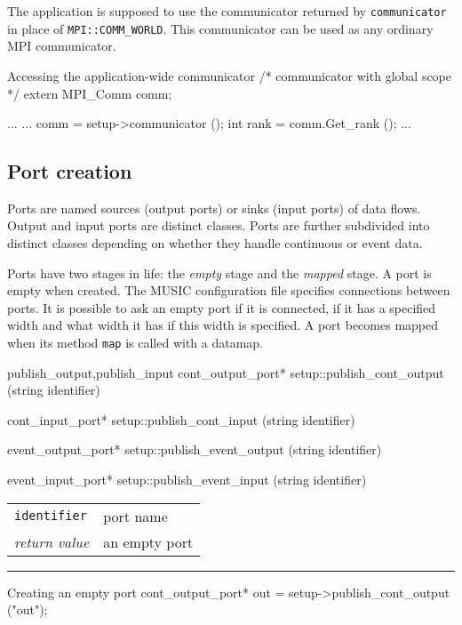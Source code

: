 \documentclass[a4paper]{report}
\makeatletter
\newenvironment{parameters}%
{\begin{tabular}{@{\hspace{2em}}lp{0.6\textwidth}}}%
{\end{tabular}\par\vspace{1mm}\par\hrule\par\vspace{5mm}}
\makeatother
\begin{document}
The application is supposed to use the communicator returned by
\lstinline|communicator| in place of \lstinline|MPI::COMM_WORLD|.  This
communicator can be used as any ordinary MPI communicator.

\begin{code}{Accessing the application-wide communicator}
/* communicator with global scope */
extern MPI_Comm comm;

...
{
  ...
  comm = setup->communicator ();
  int rank = comm.Get_rank ();
  ...
}
\end{code}

\subsection{Port creation}

Ports are named sources (output ports) or sinks (input ports) of data
flows.  Output and input ports are distinct classes.  Ports are
further subdivided into distinct classes depending on whether they
handle continuous or event data.

Ports have two stages in life: the \emph{empty} stage and the
\emph{mapped} stage.  A port is empty when created.  The MUSIC
configuration file specifies connections between ports.  It is
possible to ask an empty port if it is connected, if it has a
specified width and what width it has if this width is specified.  A port
becomes mapped when its method \lstinline|map| is called with a datamap.

\begin{head}{publish_output,publish_input}
  cont_output_port* setup::publish_cont_output (string identifier)

  cont_input_port* setup::publish_cont_input (string identifier)

  event_output_port* setup::publish_event_output (string identifier)

  event_input_port* setup::publish_event_input (string identifier)
\end{head}
\begin{parameters}
  \lstinline|identifier| & port name \\
  \emph{return value} & an empty port \\
\end{parameters}

\begin{code}{Creating an empty port}
  cont_output_port* out = setup->publish_cont_output ("out");
\end{code}
\end{document}
